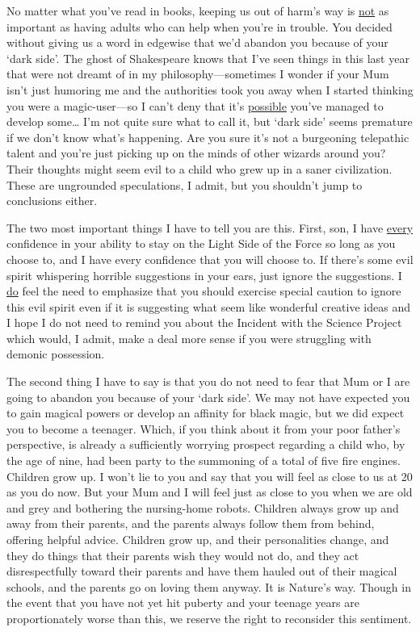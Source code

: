 \begin{writtenNote}

No matter what you've read in books, keeping us out of harm's way is 
\underline{not} as important as having adults who can help when you're in 
trouble. You decided without giving us a word in edgewise that we'd abandon you 
because of your `dark side'. The ghost of Shakespeare knows that I've seen 
things in this last year that were not dreamt of in my philosophy---sometimes I 
wonder if your Mum isn't just humoring me and the authorities took you away 
when I started thinking you were a magic-user---so I can't deny that it's 
\underline{possible} you've managed to develop some{\ldots} I'm not quite sure 
what to call it, but `dark side' seems premature if we don't know what's 
happening. Are you sure it's not a burgeoning telepathic talent and you're just 
picking up on the minds of other wizards around you? Their thoughts might seem 
evil to a child who grew up in a saner civilization. These are ungrounded 
speculations, I admit, but you shouldn't jump to conclusions either.

The two most important things I have to tell you are this. First, son, I 
have \underline{every} confidence in your ability to stay on the Light Side of 
the Force so long as you choose to, and I have every confidence that you will 
choose to. If there's some evil spirit whispering horrible suggestions in your 
ears, just ignore the suggestions. I \underline{do} feel the need to emphasize 
that you should exercise special caution to ignore this evil spirit even if it 
is suggesting what seem like wonderful creative ideas and I hope I do not need 
to remind you about the Incident with the Science Project which would, I admit, 
make a deal more sense if you were struggling with demonic possession.

The second thing I have to say is that you do not need to fear that Mum 
or I are going to abandon you because of your `dark side'. We may not have 
expected you to gain magical powers or develop an affinity for black magic, but 
we did expect you to become a teenager. Which, if you think about it from your 
poor father's perspective, is already a sufficiently worrying prospect 
regarding a child who, by the age of nine, had been party to the summoning of a 
total of five fire engines. Children grow up. I won't lie to you and say that 
you will feel as close to us at 20 as you do now. But your Mum and I will feel 
just as close to you when we are old and grey and bothering the nursing-home 
robots. Children always grow up and away from their parents, and the parents 
always follow them from behind, offering helpful advice. Children grow up, and 
their personalities change, and they do things that their parents wish they 
would not do, and they act disrespectfully toward their parents and have them 
hauled out of their magical schools, and the parents go on loving them anyway. 
It is Nature's way. Though in the event that you have not yet hit puberty and 
your teenage years are proportionately worse than this, we reserve the right to 
reconsider this sentiment.


\end{writtenNote}
